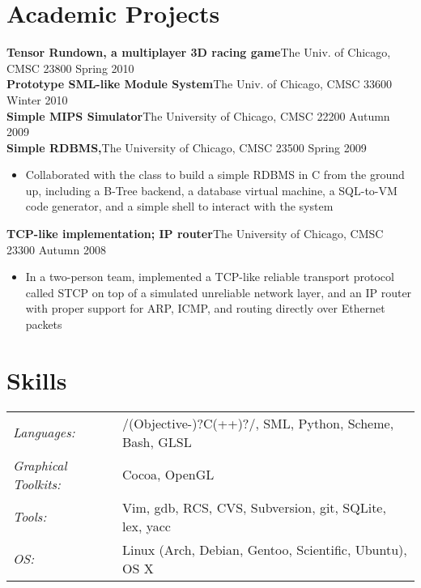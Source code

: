 \documentclass[line,overlapped]{res}
\begin{document}
\begin{resume}
\section{Academic Projects}
{\bf Tensor Rundown, a multiplayer 3D racing game}\footnotemark[2] The Univ. of Chicago, CMSC 23800 \hfill Spring 2010\\
{\bf Prototype SML-like Module System}\footnotemark[2] The Univ. of Chicago, CMSC 33600 \hfill Winter 2010\\
{\bf Simple MIPS Simulator}\footnotemark[2] The University of Chicago, CMSC 22200 \hfill Autumn 2009\\
{\bf Simple RDBMS,}\footnotemark[2] The University of Chicago, CMSC 23500 \hfill Spring 2009
\begin{itemize} \itemsep -2pt
    \item Collaborated with the class to build a simple RDBMS in C from the ground up, including a B-Tree backend, a database virtual machine, a SQL-to-VM code generator, and a simple shell to interact with the system
\end{itemize}
\vspace{-10pt}
{\bf TCP-like implementation; IP router}\footnotemark[2] The University of Chicago, CMSC 23300 \hfill Autumn 2008
\begin{itemize} \itemsep -2pt
    \item In a two-person team, implemented a TCP-like reliable transport protocol called STCP on top of a simulated unreliable network layer, and an IP router with proper support for ARP, ICMP, and routing directly over Ethernet packets
\end{itemize}


\section{Skills}
   \begin{tabular}{l p{4in}}
   {\sl Languages:}&/(Objective-)?C(++)?/, SML, Python, Scheme, Bash, GLSL\\
   {\sl Graphical Toolkits:}&Cocoa, OpenGL\\
   {\sl Tools: } & Vim, gdb, RCS, CVS, Subversion, git, SQLite, lex, yacc\\
   {\sl OS:} & Linux (Arch, Debian, Gentoo, Scientific, Ubuntu), OS X\\
 \end{tabular}

\end{resume}
\end{document}
